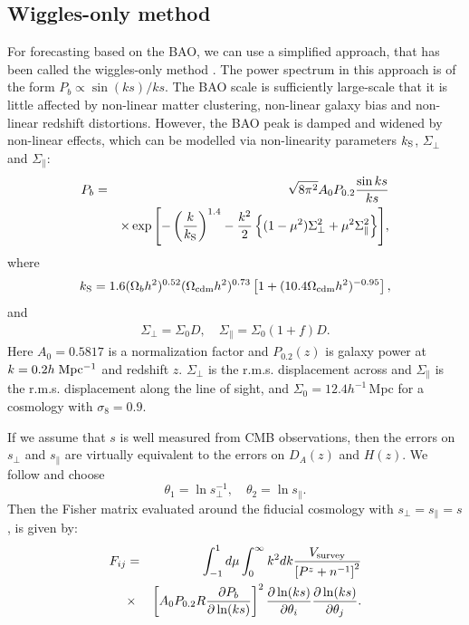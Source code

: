 \documentclass[useAMS,usenatbib]{mn2e}
\begin{document}
\subsection{ Wiggles-only method}


For forecasting based on the BAO, we can use a simplified approach, that has been called the wiggles-only method \citep{Seo:2007ns}.  The power spectrum in this approach is of the form
$ P_b \propto {\sin (ks)}/{ks}$.
The BAO scale is sufficiently large-scale that it is little affected by non-linear matter clustering, non-linear galaxy bias and non-linear redshift distortions. 
However, the BAO peak is damped and widened by non-linear effects, which can be modelled via non-linearity parameters $k_{\rm S}$, $\Sigma_{\perp}$ and $\Sigma_{\|}$: 
\begin{eqnarray}
 P_{ b} &=& \sqrt{8\pi^2} A_0 P_{0.2}\frac{\sin{ks}}{ks} \label{eq:gausilk} \\ \nonumber
 &&\times \exp{\left[-\left({k\over k_{\rm S}}\right)^{1.4}-{k^2 \over 2} \left\{(1-\mu^2)\Sigma_\perp^2+\mu^2\Sigma_\parallel^2\right\} \right]},  
 \end{eqnarray}
where
\begin{eqnarray}
k_{\rm S} = 1.6(\Omega_b h^2)^{0.52}(\Omega_{{\rm cdm}} h^2)^{0.73}\left[1+(10.4\Omega_{{\rm cdm}} h^2)^{-0.95}\right],
\end{eqnarray}
and
\begin{eqnarray}
 \Sigma_\perp=\Sigma_0 D, \quad   \Sigma_\parallel=\Sigma_0 (1+f)D.
\end{eqnarray}
Here  $A_0 = 0.5817$ is a normalization factor and $P_{0.2}(z)$ is galaxy power at $k=0.2h{\rm\;Mpc^{-1}}$ and redshift $z$.
 $\Sigma_\perp$ is the r.m.s. displacement across and $\Sigma_\parallel$ is the r.m.s. displacement  along the line of sight, and
$\Sigma_0 =12.4h^{-1}\,$Mpc for a cosmology with $\sigma_8=0.9$.
 
If we assume that $s$ is well measured from CMB observations, then the errors on $s_\perp$ and $s_\|$  are virtually equivalent to the errors on $D_A(z)$ and $H(z)$. 
We follow  \cite{Seo:2007ns} and choose
\begin{equation}
 \theta_1=\ln{s_\perp^{-1}}, \quad \theta_2=\ln{s_\parallel}.
 \end{equation}
 Then  the Fisher matrix  evaluated around the fiducial cosmology with  $s_\perp=s_\parallel=s$, is given by:
\begin{eqnarray}\label{FIJ_DEV}
F_{ij}&=&\int_{-1}^{1}d\mu\int_{0}^{\infty}k^2dk \frac{V_{\rm survey}}{\left[P^z+n^{-1}\right]^2}\nonumber \\
& \times & \left[ A_0 P_{0.2}  R\frac{\partial P_{b}}{\partial \ln (ks)} \right ]^2 
 \frac{\partial \ln (ks)}{\partial \theta_i}\frac{\partial \ln (ks)}{\partial \theta_j} .
\end{eqnarray}
\end{document}
